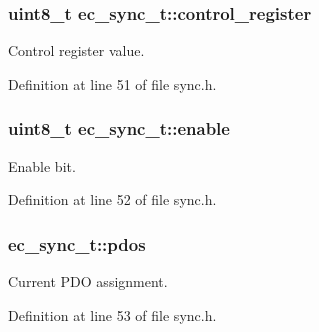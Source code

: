 \subsubsection[{control\-\_\-register}]{\setlength{\rightskip}{0pt plus 5cm}uint8\-\_\-t ec\-\_\-sync\-\_\-t\-::control\-\_\-register}\label{structec__sync__t_aede99eccf8db60056e6deebe66501365}


Control register value. 



Definition at line 51 of file sync.\-h.

\subsubsection[{enable}]{\setlength{\rightskip}{0pt plus 5cm}uint8\-\_\-t ec\-\_\-sync\-\_\-t\-::enable}\label{structec__sync__t_a581dfbd7e289ab43dc3f5b7f844c4776}


Enable bit. 



Definition at line 52 of file sync.\-h.

\subsubsection[{pdos}]{ ec\-\_\-sync\-\_\-t\-::pdos}\label{structec__sync__t_a96e5121c2fd258439b25d1a826ec5970}


Current P\-D\-O assignment. 



Definition at line 53 of file sync.\-h.

